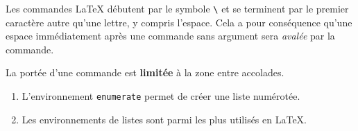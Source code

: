 \documentclass[12pt,french]{article}
\begin{document}
Les commandes {\LaTeX} débutent par le symbole \verb=\= et se
terminent par le premier caractère autre qu'une lettre, y compris
l'espace. Cela a pour conséquence qu'une espace immédiatement après
une commande sans argument sera \emph{avalée} par la commande.

La portée d'une commande est {\bfseries limitée} à la zone entre accolades.

\begin{enumerate}
\item L'environnement \texttt{enumerate} permet de créer une liste
  numérotée.
\item Les environnements de listes sont parmi les plus utilisés en
  \LaTeX.
\end{enumerate}
\end{document}
